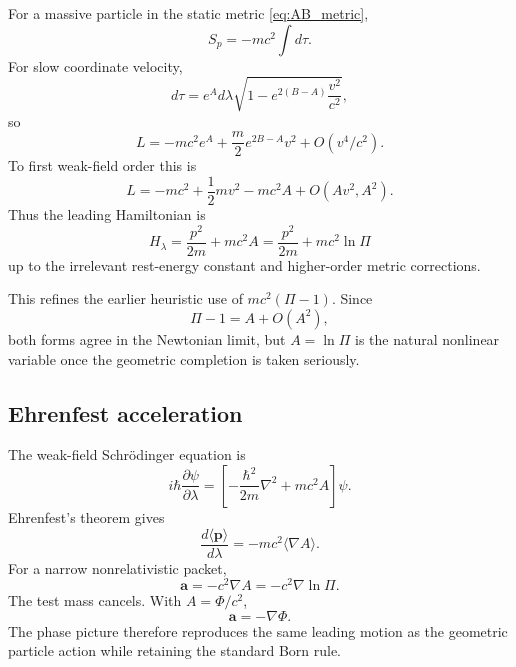 \documentclass[11pt]{article}
\begin{document}
For a massive particle in the static metric \eqref{eq:AB_metric},
\begin{equation}
    S_p=-mc^2\int d\tau.
\end{equation}
For slow coordinate velocity,
\begin{equation}
    d\tau
    =e^A d\lambda
    \sqrt{1-e^{2(B-A)}\frac{v^2}{c^2}},
\end{equation}
so
\begin{equation}
    L
    =-mc^2e^A
    +\frac{m}{2}e^{2B-A}v^2+O(v^4/c^2).
    \label{eq:particle_L}
\end{equation}
To first weak-field order this is
\begin{equation}
    L=-mc^2+\frac12mv^2-mc^2A+O(A v^2,A^2).
\end{equation}
Thus the leading Hamiltonian is
\begin{equation}
    \boxed{
    H_\lambda
    =\frac{p^2}{2m}+mc^2A
    =\frac{p^2}{2m}+mc^2\ln\Pi}
    \label{eq:H_A}
\end{equation}
up to the irrelevant rest-energy constant and higher-order metric corrections.

This refines the earlier heuristic use of $mc^2(\Pi-1)$. Since
\begin{equation}
    \Pi-1=A+O(A^2),
\end{equation}
both forms agree in the Newtonian limit, but $A=\ln\Pi$ is the natural nonlinear variable once the geometric completion is taken seriously.

\subsection{Ehrenfest acceleration}

The weak-field Schr\"odinger equation is
\begin{equation}
    i\hbar\frac{\partial\psi}{\partial\lambda}
    =\left[-\frac{\hbar^2}{2m}\nabla^2+mc^2A\right]\psi.
\end{equation}
Ehrenfest's theorem gives
\begin{equation}
    \frac{d\langle\mathbf p\rangle}{d\lambda}
    =-mc^2\langle\nabla A\rangle.
\end{equation}
For a narrow nonrelativistic packet,
\begin{equation}
    \boxed{
    \mathbf a
    =-c^2\nabla A
    =-c^2\nabla\ln\Pi.}
    \label{eq:a_lnPi}
\end{equation}
The test mass cancels. With $A=\Phi/c^2$,
\begin{equation}
    \mathbf a=-\nabla\Phi.
\end{equation}
The phase picture therefore reproduces the same leading motion as the geometric particle action while retaining the standard Born rule.
\end{document}
